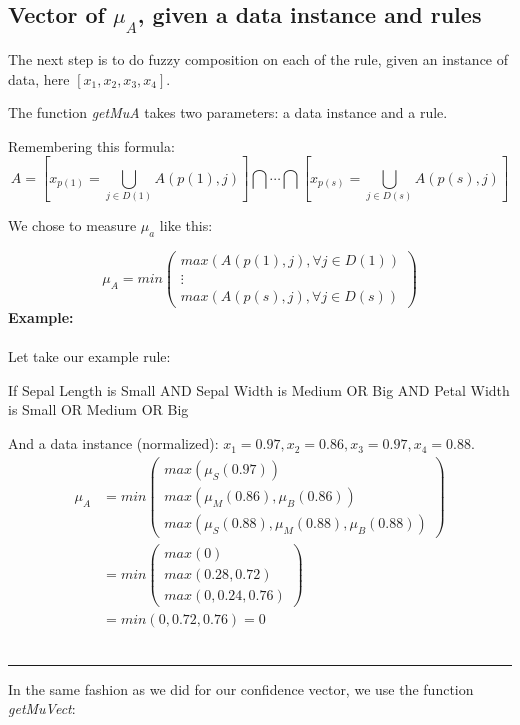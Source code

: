 \documentclass[a4paper,12pt]{article}
\begin{document}
\subsection{Vector of $\mu_A$, given a data instance and rules}

The next step is to do fuzzy composition on each of the rule, given an instance of data, here $[x_1,x_2,x_3,x_4]$.

The function \textit{getMuA} takes two parameters: a data instance and a rule.

Remembering this formula:
\[A=[x_{p(1)}=\bigcup_{j\in D(1)}A(p(1),j) ] \bigcap\cdots\bigcap[x_{p(s)}=\bigcup_{j\in D(s)}A(p(s),j)]\]

We chose to measure $\mu_a$ like this:

\[\mu_A=
min
\begin{pmatrix}
max(A(p(1),j),\forall j \in D(1))\\
\vdots \\
max(A(p(s),j),\forall j \in D(s))
\end{pmatrix}
    \]
\textbf{Example:}\\
\\
Let take our example rule:
\begin{center}
If Sepal Length is Small AND Sepal Width is Medium OR Big AND Petal Width is Small OR Medium OR Big
\end{center}
And a data instance (normalized): $x_1=0.97,x_2=0.86,x_3=0.97,x_4=0.88$.\\
\[
\begin{split}
\mu_A &= min
\begin{pmatrix}
max(\mu_S(0.97))\\
max(\mu_M(0.86),\mu_B(0.86))\\
max(\mu_S(0.88),\mu_M(0.88),\mu_B(0.88))
\end{pmatrix}\\
&= min
\begin{pmatrix}
max(0)\\
max(0.28,0.72)\\
max(0,0.24,0.76)
\end{pmatrix}\\
&= min(0,0.72,0.76) = 0
\end{split}
\]
\\
\begin{center} \rule[1ex]{.5\textwidth}{.5pt} \end{center}
\newpage

In the same fashion as we did for our confidence vector, we use the function \textit{getMuVect}:
\end{document}
